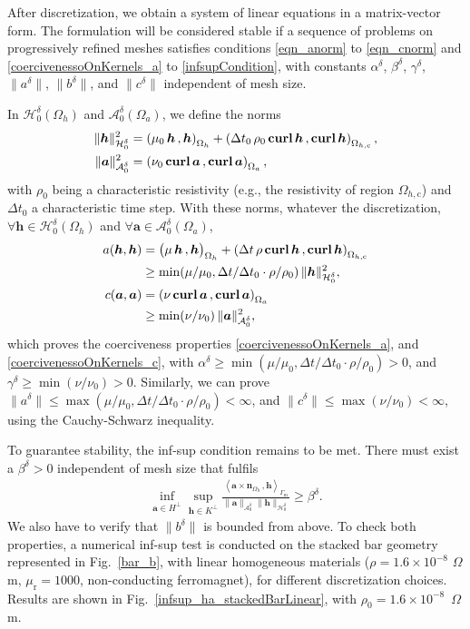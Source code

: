 \documentclass[journal]{IEEEtran}
\renewcommand{\vec}[1]{\boldsymbol{#1}} %
\newcommand{\paren}[1]{\left(#1\right)}
\newcommand{\parenangle}[1]{\left\langle#1\right\rangle}
\newcommand{\volInt}[3]{\paren{#1 \, , #2}_{#3}}
\newcommand{\volIntBig}[3]{\big(#1 \, , #2\big)_{#3}}
\newcommand{\surInt}[3]{\parenangle{#1 \, , #2}_{#3}}
\newcommand{\curl}{\text{\textbf{curl}}\, }
\renewcommand{\a}{\vec a}
\newcommand{\h}{\vec h}
\newcommand{\mur}{\mu_\text{r}}
\renewcommand{\O}{\Omega}
\newcommand{\Oa}{\Omega_a}
\newcommand{\Oh}{\Omega_h}
\newcommand{\Ohc}{\Omega_{h,\text{c}}}
\newcommand{\hspzd}{\mathcal{H}_{0}^{\delta}}
\newcommand{\aspzd}{\mathcal{A}_{0}^{\delta}}
\begin{document}
After discretization, we obtain a system of linear equations in a matrix-vector form. The formulation will be considered stable if a sequence of problems on progressively refined meshes satisfies conditions \eqref{eqn_anorm} to \eqref{eqn_cnorm} and \eqref{coercivenessoOnKernels_a} to \eqref{infsupCondition}, with constants $\alpha^\delta$, $\beta^\delta$, $\gamma^\delta$, $\|a^\delta\|$, $\|b^\delta\|$, and $\|c^\delta\|$ independent of mesh size.

In $\hspzd(\Oh)$ and $\aspzd(\Oa)$, we define the norms
\begin{align}\label{ha_normH}
\|\h\|_{\hspzd}^2 &= \volInt{\mu_0\,\h}{\h}{\Oh}+ \volInt{\Delta t_0\,\rho_0\,\curl \h}{\curl \h}{\Ohc},\\
\|\a\|_{\aspzd}^2 &= \volInt{\nu_0\,\curl \a}{\curl \a}{\Oa},\label{ha_normA}
\end{align}
with $\rho_0$ being a characteristic resistivity (e.g., the resistivity of region $\Ohc$) and $\Delta t_0$ a characteristic time step. With these norms, whatever the discretization, $\forall \h\in \hspzd(\Oh)$ and $\forall \a\in \aspzd(\Oa)$,
\begin{align}
a(\h,\h) &= \volIntBig{\mu\, \h}{\h}{\Oh} + \volInt{\Delta t\, \rho\, \curl \h}{\curl \h}{\Ohc}\notag\\
&\ge \min(\mu/\mu_0,\Delta t/\Delta t_0\cdot \rho/\rho_0)\, \|\h\|_{\hspzd}^2,\\
c(\a,\a) &= \volInt{\nu\, \curl \a}{\curl \a}{\Oa}\notag\\
&\ge \min(\nu/\nu_0)\, \|\a\|_{\aspzd}^2,
\end{align}
which proves the coerciveness properties \eqref{coercivenessoOnKernels_a}, and \eqref{coercivenessoOnKernels_c}, with $\alpha^\delta \ge \min(\mu/\mu_0,\Delta t/\Delta t_0\cdot \rho/\rho_0)>0$, and $\gamma^\delta \ge \min(\nu/\nu_0)>0$. Similarly, we can prove $\|a^\delta\| \le \max(\mu/\mu_0,\Delta t/\Delta t_0\cdot \rho/\rho_0)<\infty$, and $\|c^\delta\| \le \max(\nu/\nu_0)<\infty$, using the Cauchy-Schwarz inequality.

To guarantee stability, the inf-sup condition remains to be met. There must exist a $\beta^\delta > 0$ independent of mesh size that fulfils
\begin{align}\label{eqn_infsup_ha}
\inf_{\a \in H^{\perp}} \sup_{\h \in K^\perp} \frac{\surInt{\a \times\vec n_{\Oh}}{\h}{\Gamma_\text{m}}}{\|\a\|_{\aspzd} \|\h\|_{\hspzd}} \ge \beta^\delta.
\end{align}
We also have to verify that $\|b^\delta\|$ is bounded from above. To check both properties, a numerical inf-sup test is conducted on the stacked bar geometry represented in Fig.~\ref{bar_b}, with linear homogeneous materials ($\rho = 1.6\times 10^{-8}$ $\Omega$m, $\mur = 1000$, non-conducting ferromagnet), for different discretization choices. Results are shown in Fig.~\ref{infsup_ha_stackedBarLinear}, with $\rho_0 = 1.6\times 10^{-8}$~$\O$m.
\end{document}
